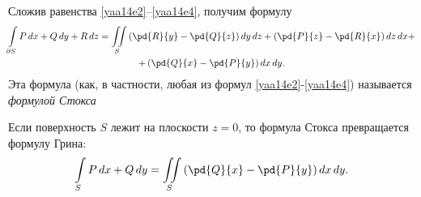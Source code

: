 Сложив равенства \eqref{yaa14e2}--\eqref{yaa14e4}, получим формулу
\begin{multline*}
\int\limits_{\partial S} P\,dx+Q\,dy+R\,dz = \iint\limits_S \left(\pd{R}{y}-\pd{Q}{z}\right)dy\,dz + \left(\pd{P}{z}-\pd{R}{x}\right)dz\,dx+\\+\left(\pd{Q}{x}-\pd{P}{y}\right)dx\,dy.
\end{multline*}
Эта формула (как, в частности, любая из формул \eqref{yaa14e2}-\eqref{yaa14e4}) называется \textit{формулой Стокса}

Если поверхность $S$ лежит на плоскости $z=0$, то формула Стокса превращается формулу Грина: 
$$
\int\limits_S P\,dx+Q\,dy = \iint\limits_S\left(\pd{Q}{x}-\pd{P}{y}\right)dx\,dy.
$$


